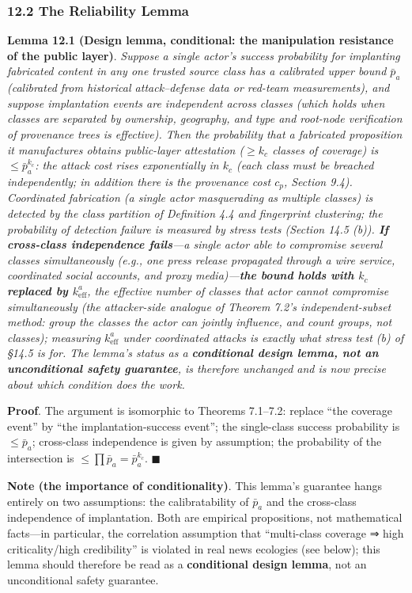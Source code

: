 \documentclass[
  11pt]{article}
\begin{document}
\subsubsection{12.2 The Reliability Lemma}\label{the-reliability-lemma}

\textbf{Lemma 12.1 (Design lemma, conditional: the manipulation
resistance of the public layer)}. \emph{Suppose a single actor's success
probability for implanting fabricated content in any one trusted source
class has a calibrated upper bound \(\bar p_a\) (calibrated from
historical attack--defense data or red-team measurements), and suppose
implantation events are independent across classes (which holds when
classes are separated by ownership, geography, and type and root-node
verification of provenance trees is effective). Then the probability
that a fabricated proposition it manufactures obtains public-layer
attestation (\(\ge k_c\) classes of coverage) is \(\le \bar p_a^{k_c}\):
the attack cost rises exponentially in \(k_c\) (each class must be
breached independently; in addition there is the provenance cost
\(c_p\), Section 9.4). Coordinated fabrication (a single actor
masquerading as multiple classes) is detected by the class partition of
Definition 4.4 and fingerprint clustering; the probability of detection
failure is measured by stress tests (Section 14.5 (b)). \textbf{If
cross-class independence fails}---a single actor able to compromise
several classes simultaneously (e.g., one press release propagated
through a wire service, coordinated social accounts, and proxy
media)---\textbf{the bound holds with \(k_c\) replaced by
\(k_{\mathrm{eff}}^a\)}, the effective number of classes that actor
cannot compromise simultaneously (the attacker-side analogue of Theorem
7.2's independent-subset method: group the classes the actor can jointly
influence, and count groups, not classes); measuring
\(k_{\mathrm{eff}}^a\) under coordinated attacks is exactly what stress
test (b) of §14.5 is for. The lemma's status as a \textbf{conditional
design lemma, not an unconditional safety guarantee}, is therefore
unchanged and is now precise about which condition does the work.}

\textbf{Proof}. The argument is isomorphic to Theorems 7.1--7.2: replace
``the coverage event'' by ``the implantation-success event''; the
single-class success probability is \(\le \bar p_a\); cross-class
independence is given by assumption; the probability of the intersection
is \(\le \prod \bar p_a = \bar p_a^{k_c}\). \(\blacksquare\)

\textbf{Note (the importance of conditionality)}. This lemma's guarantee
hangs entirely on two assumptions: the calibratability of \(\bar p_a\)
and the cross-class independence of implantation. Both are empirical
propositions, not mathematical facts---in particular, the correlation
assumption that ``multi-class coverage ⇒ high criticality/high
credibility'' is violated in real news ecologies (see below); this lemma
should therefore be read as a \textbf{conditional design lemma}, not an
unconditional safety guarantee.
\end{document}

